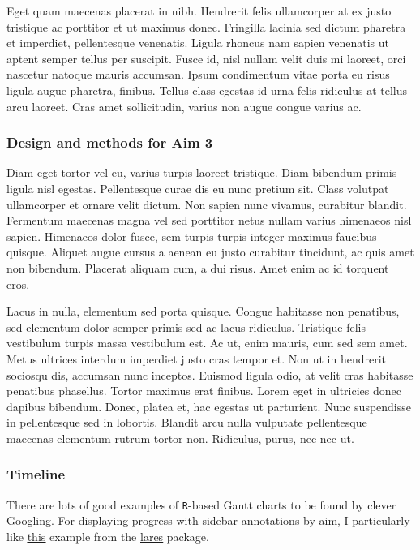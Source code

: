 \documentclass[11pt,]{article}
\begin{document}
Eget quam maecenas placerat in nibh. Hendrerit felis ullamcorper at ex
justo tristique ac porttitor et ut maximus donec. Fringilla lacinia sed
dictum pharetra et imperdiet, pellentesque venenatis. Ligula rhoncus nam
sapien venenatis ut aptent semper tellus per suscipit. Fusce id, nisl
nullam velit duis mi laoreet, orci nascetur natoque mauris accumsan.
Ipsum condimentum vitae porta eu risus ligula augue pharetra, finibus.
Tellus class egestas id urna felis ridiculus at tellus arcu laoreet.
Cras amet sollicitudin, varius non augue congue varius ac.

\hypertarget{design-and-methods-for-aim-3}{%
\subsubsection{Design and methods for Aim
3}\label{design-and-methods-for-aim-3}}

Diam eget tortor vel eu, varius turpis laoreet tristique. Diam bibendum
primis ligula nisl egestas. Pellentesque curae dis eu nunc pretium sit.
Class volutpat ullamcorper et ornare velit dictum. Non sapien nunc
vivamus, curabitur blandit. Fermentum maecenas magna vel sed porttitor
netus nullam varius himenaeos nisl sapien. Himenaeos dolor fusce, sem
turpis turpis integer maximus faucibus quisque. Aliquet augue cursus a
aenean eu justo curabitur tincidunt, ac quis amet non bibendum. Placerat
aliquam cum, a dui risus. Amet enim ac id torquent eros.

Lacus in nulla, elementum sed porta quisque. Congue habitasse non
penatibus, sed elementum dolor semper primis sed ac lacus ridiculus.
Tristique felis vestibulum turpis massa vestibulum est. Ac ut, enim
mauris, cum sed sem amet. Metus ultrices interdum imperdiet justo cras
tempor et. Non ut in hendrerit sociosqu dis, accumsan nunc inceptos.
Euismod ligula odio, at velit cras habitasse penatibus phasellus. Tortor
maximus erat finibus. Lorem eget in ultricies donec dapibus bibendum.
Donec, platea et, hac egestas ut parturient. Nunc suspendisse in
pellentesque sed in lobortis. Blandit arcu nulla vulputate pellentesque
maecenas elementum rutrum tortor non. Ridiculus, purus, nec nec ut.

\hypertarget{timeline}{%
\subsubsection{Timeline}\label{timeline}}

There are lots of good examples of \texttt{R}-based Gantt charts to be
found by clever Googling. For displaying progress with sidebar
annotations by aim, I particularly like
\href{https://datascienceplus.com/visualize-your-cvs-timeline-with-r-gantt-style/}{\underline{this}}
example from the
\href{https://github.com/laresbernardo/lares}{\underline{lares}}
package.
\end{document}

